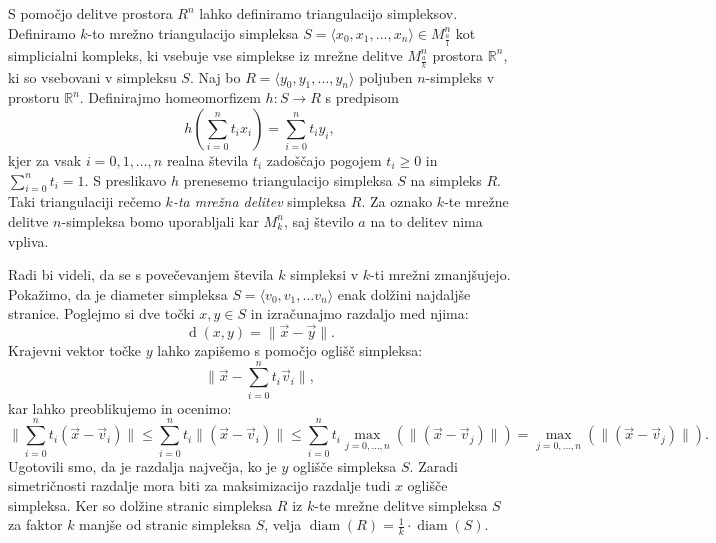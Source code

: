 \documentclass[mat1]{fmfdelo}
\newcommand{\R}{\mathbb R}
\DeclareMathOperator{\diam}{diam}
\DeclareMathOperator{\dist}{d}
\newcommand{\0}{0}
\begin{document}
S pomočjo delitve prostora $R^n$ lahko definiramo triangulacijo simpleksov. Definiramo $k$-to mrežno triangulacijo simpleksa $S = \langle x_0, x_1, \dots, x_n \rangle \in M^n_{\frac{a}{1}}$ kot simplicialni kompleks, ki vsebuje vse simplekse iz mrežne delitve $M^n_{\frac{a}{k}}$ prostora $\R^n$, ki so vsebovani v simpleksu $S$.
Naj bo $R = \langle y_0, y_1, \dots, y_n \rangle$ poljuben $n$-simpleks v prostoru $\R^n$. Definirajmo homeomorfizem $h : S \to R$ s predpisom
$$h \left( \sum_{i=0}^n t_i x_i \right) = \sum_{i=0}^n t_i y_i,$$
kjer za vsak $i=0, 1, \dots, n$ realna števila $t_i$ zadoščajo pogojem $t_i \geq 0$ in $\sum_{i=0}^n t_i = 1$.
S preslikavo $h$ prenesemo triangulacijo simpleksa $S$ na simpleks $R$. Taki triangulaciji rečemo \emph{$k$-ta mrežna delitev} simpleksa $R$. Za oznako $k$-te mrežne delitve $n$-simpleksa bomo uporabljali kar $M_k^n$, saj število $a$ na to delitev nima vpliva. 

Radi bi videli, da se s povečevanjem števila $k$ simpleksi v $k$-ti mrežni zmanjšujejo.
Pokažimo, da je diameter simpleksa $S = \langle v_0, v_1, \dots v_n \rangle$ enak dolžini najdaljše stranice. Poglejmo si dve točki $x, y \in S$ in izračunajmo razdaljo med njima:
$$\dist(x, y) = \| \vec{x} - \vec{y} \|.$$
Krajevni vektor točke $y$ lahko zapišemo s pomočjo oglišč simpleksa:
$$\| \vec{x} - \sum_{i=0}^n t_i \vec{v}_i \|,$$
kar lahko preoblikujemo in ocenimo:
$$\| \sum_{i=0}^n t_i (\vec{x} - \vec{v}_i)\| \leq \sum_{i=0}^n t_i \| (\vec{x} - \vec{v}_i) \| \leq \sum_{i=0}^n t_i \max_{j=0, \dots, n}(\| (\vec{x} - \vec{v}_j) \|) = \max_{j=0, \dots, n}(\| (\vec{x} - \vec{v}_j) \|).$$
Ugotovili smo, da je razdalja največja, ko je $y$ oglišče simpleksa $S$. Zaradi simetričnosti razdalje mora biti za maksimizacijo razdalje tudi $x$ oglišče simpleksa.
Ker so dolžine stranic simpleksa $R$ iz $k$-te mrežne delitve simpleksa $S$ za faktor $k$ manjše od stranic simpleksa $S$, velja $\diam(R) = \frac{1}{k} \cdot \diam(S)$.
\end{document}
